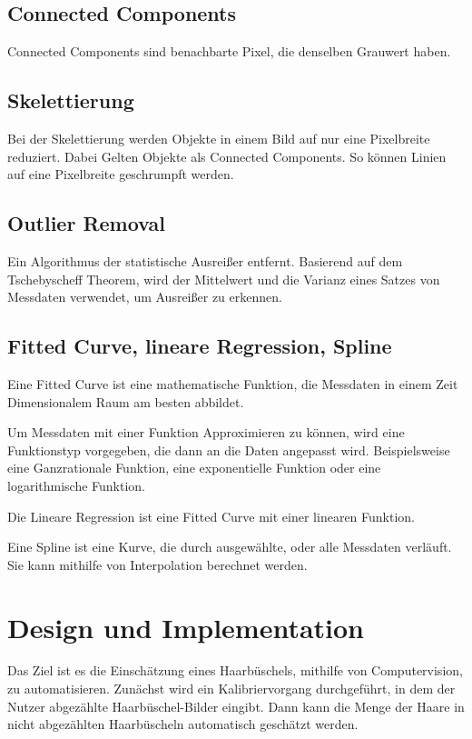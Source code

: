 \documentclass[german,a4paper, 12pt]{llncs}
\begin{document}
\subsection{Connected Components}

Connected Components sind benachbarte Pixel, die denselben Grauwert haben. \cite{ConnectedComponents}

\subsection{Skelettierung}
Bei der Skelettierung werden Objekte in einem Bild auf nur eine Pixelbreite reduziert. Dabei Gelten Objekte als Connected Components. So können Linien auf eine Pixelbreite geschrumpft werden.\cite{skel}

\subsection{Outlier Removal}

Ein Algorithmus der statistische Ausreißer entfernt. 
Basierend auf dem Tschebyscheff Theorem, wird der Mittelwert und die Varianz eines Satzes von Messdaten verwendet, um Ausreißer zu erkennen.\cite{outlierRemoval}

\subsection{Fitted Curve, lineare Regression, Spline}

Eine Fitted Curve ist eine mathematische Funktion, die Messdaten in einem Zeit Dimensionalem Raum am besten abbildet.


Um Messdaten mit einer Funktion Approximieren zu können, wird eine Funktionstyp vorgegeben, die dann an die Daten angepasst wird. 
Beispielsweise eine Ganzrationale Funktion, eine exponentielle Funktion oder eine logarithmische Funktion. 

Die Lineare Regression ist eine Fitted Curve mit einer linearen Funktion.\cite{curveFittingIntro,curveFittingScipy}

Eine Spline ist eine Kurve, die durch ausgewählte, oder alle Messdaten verläuft. Sie kann mithilfe von Interpolation berechnet werden.\cite{splineScipy}

\section{Design und Implementation}

Das Ziel ist es die Einschätzung eines Haarbüschels, mithilfe von Computervision, zu automatisieren. Zunächst wird ein Kalibriervorgang durchgeführt, in dem der Nutzer abgezählte Haarbüschel-Bilder eingibt. Dann kann die Menge der Haare in nicht abgezählten Haarbüscheln automatisch geschätzt werden.
\end{document}
